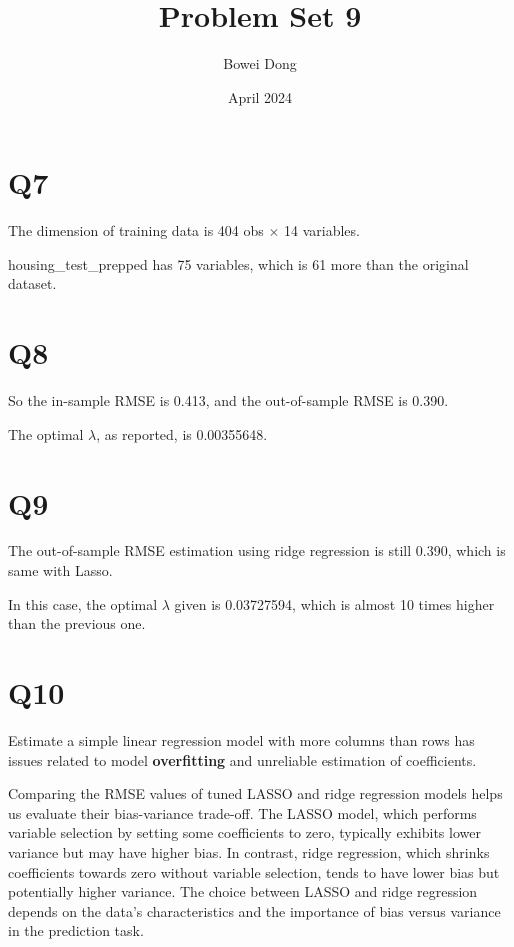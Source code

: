 \documentclass{article}
\title{Problem Set 9}
\author{Bowei Dong}
\date{April 2024}
\begin{document}
\maketitle

\section*{Q7}

The dimension of training data is 404 obs $\times$ 14 variables. 

housing\_test\_prepped has 75 variables, which is 61 more than the original dataset.

\section*{Q8}

So the in-sample RMSE is 0.413, and  the out-of-sample RMSE is 0.390. 

The optimal $\lambda$, as reported, is 0.00355648.

\section*{Q9}

The out-of-sample RMSE estimation using ridge regression is still 0.390, which is same with Lasso. 

In this case, the optimal $\lambda$ given is 0.03727594, which is almost 10 times higher than the previous one. 

\section*{Q10}

Estimate a simple linear regression model with more columns than rows has issues related to model \textbf{overfitting} and unreliable estimation of coefficients. 

Comparing the RMSE values of tuned LASSO and ridge regression models helps us evaluate their bias-variance trade-off. The LASSO model, which performs variable selection by setting some coefficients to zero, typically exhibits lower variance but may have higher bias. In contrast, ridge regression, which shrinks coefficients towards zero without variable selection, tends to have lower bias but potentially higher variance. The choice between LASSO and ridge regression depends on the data's characteristics and the importance of bias versus variance in the prediction task.
\end{document}
